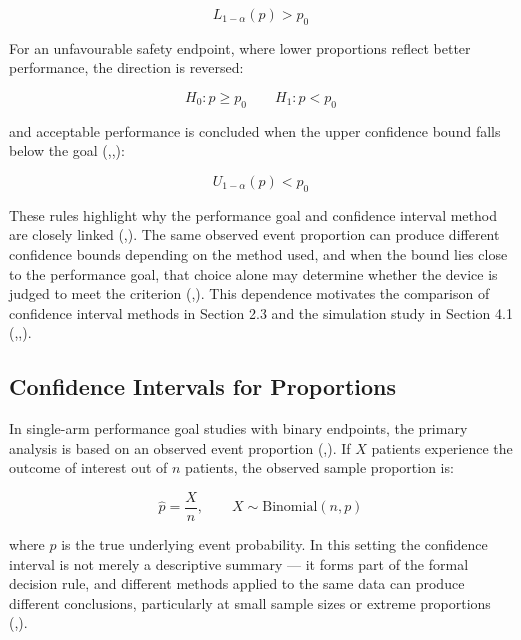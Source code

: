 \documentclass{article}
\begin{document}
\[L_{1-\alpha}(p) > p_0\]

For an unfavourable safety endpoint, where lower proportions reflect
better performance, the direction is reversed:

\[H_0: p \geq p_0 \qquad H_1: p < p_0\]

and acceptable performance is concluded when the upper confidence bound
falls below the goal
(,,):

\[U_{1-\alpha}(p) < p_0\]

These rules highlight why the performance goal and confidence interval
method are closely linked
(,).
The same observed event proportion can produce different confidence
bounds depending on the method used, and when the bound lies close to
the performance goal, that choice alone may determine whether the device
is judged to meet the criterion
(,).
This dependence motivates the comparison of confidence interval methods
in Section 2.3 and the simulation study in Section 4.1
(,,).

\subsection{Confidence Intervals for
Proportions}\label{confidence-intervals-for-proportions}

In single-arm performance goal studies with binary endpoints, the
primary analysis is based on an observed event proportion
(,).
If \(X\) patients experience the outcome of interest out of \(n\)
patients, the observed sample proportion is:

\[\hat{p} = \frac{X}{n}, \qquad X \sim \text{Binomial}(n, p)\]

where \(p\) is the true underlying event probability. In this setting
the confidence interval is not merely a descriptive summary --- it forms
part of the formal decision rule, and different methods applied to the
same data can produce different conclusions, particularly at small
sample sizes or extreme proportions
(,).
\end{document}
